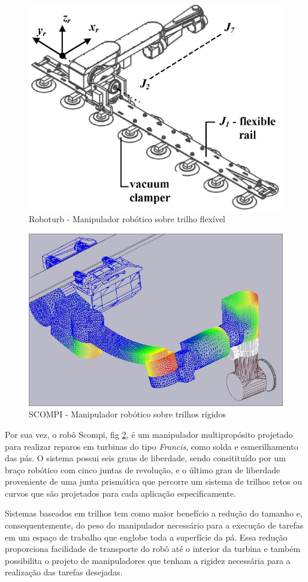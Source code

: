     \begin{figure}[h!]
    \centering	
		\includegraphics[width=0.5\columnwidth]{sota/figs/trilhos/roboturbpaper}
		\caption{Roboturb \citep{roboturb} - Manipulador robótico sobre trilho
		flexível}
		\label{fig::roboturb}
	\end{figure}
	\begin{figure}[h!]
	\centering
		\includegraphics[width=0.5\columnwidth]{sota/figs/trilhos/scompi}
		\caption{SCOMPI \citep{scompi} - Manipulador robótico sobre trilhos rígidos}
		\label{fig::scompi}
	\end{figure}

Por sua vez, o robô Scompi, fig \ref{fig::scompi}, é um manipulador
multipropósito projetado para realizar reparos em turbinas do tipo \textit{Francis},
 como solda e esmerilhamento das pás. O sistema possui seis graus de liberdade,
 sendo consitituído por um braço robótico com cinco juntas de revolução, e o
 último grau de liberdade proveniente de uma junta prismática que percorre um sistema de 
 trilhos retos ou curvos que são projetados para cada aplicação especificamente. 


Sistemas baseados em trilhos tem como maior benefício a redução do tamanho e,
consequentemente, do peso do manipulador necessário para a execução de tarefas
em um espaço de trabalho que englobe toda a superfície da pá.
Essa redução proporciona facilidade de transporte do robô até o interior da
turbina e também possibilita o projeto de manipuladores que tenham a rigidez
necessária para a realização das tarefas desejadas. 

